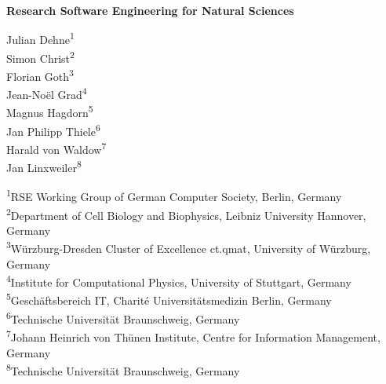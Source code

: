 

\newcommand{\orcidicon}[1]{%
    \href{https://orcid.org/#1}{\textcolor[HTML]{A6CE39}{\aiOrcid}}%
}

\begin{titlepage}
    \onecolumn
    \centering
    \vspace*{2cm}

    {\LARGE\bfseries Research Software Engineering for Natural Sciences\par}

    \vspace{1.5cm}

    {\large
    Julian Dehne\textsuperscript{1}\;\orcidicon{0000-0001-9265-9619}\\
    Simon Christ\textsuperscript{2}\;\orcidicon{0000-0002-5866-1472}\\
    Florian Goth\textsuperscript{3}\;\orcidicon{0000-0003-2707-4790}\\
    Jean-Noël Grad\textsuperscript{4}\;\orcidicon{0000-0002-5821-4912}\\
    Magnus Hagdorn\textsuperscript{5}\;\orcidicon{0000-0002-5076-4864}\\
    Jan Philipp Thiele\textsuperscript{6}\;\orcidicon{0000-0002-2755-5087}\\
    Harald von Waldow\textsuperscript{7}\;\orcidicon{0000-0003-4800-2833}\\
    Jan Linxweiler\textsuperscript{8}\;\orcidicon{0000-0002-2755-5087}\\
    }

    \vspace{.5cm}

    {\small
    \textsuperscript{1}\;RSE Working Group of German Computer Society, Berlin, Germany\\
    \textsuperscript{2}\;Department of Cell Biology and Biophysics, Leibniz University Hannover, Germany\\
    \textsuperscript{3}\;Würzburg-Dresden Cluster of Excellence ct.qmat, University of Würzburg, Germany\\
    \textsuperscript{4}\;Institute for Computational Physics, University of Stuttgart, Germany\\
    \textsuperscript{5}\;Geschäftsbereich IT, Charité Universitätsmedizin Berlin, Germany\\
    \textsuperscript{6}\;Technische Universität Braunschweig, Germany\\
    \textsuperscript{7}\;Johann Heinrich von Thünen Institute, Centre for Information Management, Germany\\
    \textsuperscript{8}\;Technische Universität Braunschweig, Germany\\
    }


\end{titlepage}
